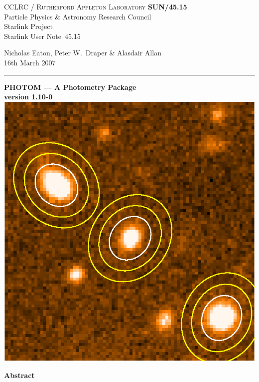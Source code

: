 \documentclass[twoside,11pt]{article}
\newcommand{\stardoccategory}  {Starlink User Note}
\newcommand{\stardocinitials}  {SUN}
\newcommand{\stardocnumber}    {45.15}
\newcommand{\stardocauthors}   {Nicholas Eaton, Peter W.\ Draper \& Alasdair Allan}
\newcommand{\stardocdate}      {16th March 2007}
\newcommand{\stardoctitle}     {PHOTOM --- A Photometry Package }
\newcommand{\stardocversion}   {version 1.10-0}
\newcommand{\stardocname}{\stardocinitials /\stardocnumber}
\newenvironment{latexonly}{}{}
\renewcommand{\_}{\texttt{\symbol{95}}}
\begin{document}
\thispagestyle{empty}

\begin{latexonly}
   CCLRC / \textsc{Rutherford Appleton Laboratory} \hfill \textbf{\stardocname}\\
   {\large Particle Physics \& Astronomy Research Council}\\
   {\large Starlink Project\\}
   {\large \stardoccategory\ \stardocnumber}
   \begin{flushright}
   \stardocauthors\\
   \stardocdate
   \end{flushright}
   \vspace{-4mm}
   \rule{\textwidth}{0.5mm}
   \vspace{5mm}
   \begin{center}
   {\LARGE\bf  \stardoctitle \\ [2.5ex]}
   {\Large\bf  \stardocversion \\ [4ex]}
   \includegraphics{sun45fig.ps}
   \end{center}
   \vspace{5mm}


   \vspace{10mm}
   \begin{center}
      {\Large\textbf{Abstract}}
   \end{center}
\end{latexonly}
\end{document}

